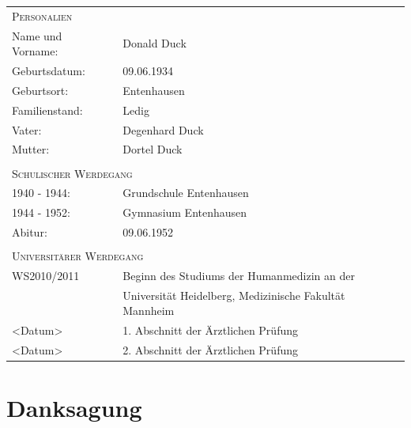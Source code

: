 \documentclass{scrreprt}
\begin{document}
\begin{tabular}{p{4cm}l}
	\multicolumn{2}{l}{{\large \scshape{Personalien}}} \\[0,6em]
	
	Name und Vorname:	& Donald Duck \\[0,5em]
	
	Geburtsdatum: 		& 09.06.1934 \\[0,5em]
	
	Geburtsort: 		& Entenhausen \\[0,5em]
	
	Familienstand: 		& Ledig\\[0,5em]
	
	Vater: 				& Degenhard Duck\\[0,5em]
	
	Mutter: 			& Dortel Duck\\[0,5em]
	& \\[0,5em]
	\multicolumn{2}{l}{{\Large \scshape{Schulischer Werdegang}}} \\[0,6em]
	
	1940 - 1944: 	& Grundschule Entenhausen\\[0,5em]

	1944 - 1952: 	& Gymnasium Entenhausen\\[0,5em]

	Abitur: 			& 09.06.1952 \\[0,5em]
	&\\[0,5em]
		\multicolumn{2}{l}{{\Large \scshape{Universitärer Werdegang}}} \\[0,6em]
	WS2010/2011			& Beginn des Studiums der Humanmedizin an der \\
						& Universität Heidelberg, Medizinische Fakultät Mannheim\\ [0,5em]
						
	<Datum> 		& 1. Abschnitt der Ärztlichen Prüfung\\
	<Datum> 		& 2. Abschnitt der Ärztlichen Prüfung
\end{tabular}



\chapter*{Danksagung}
\end{document}
